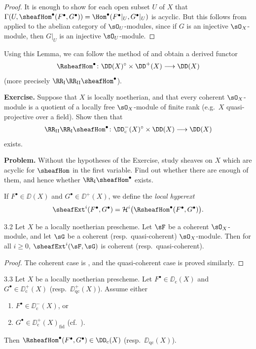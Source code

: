 \begin{proof}
It is enough to show for each open subset $U$ of $X$ that
$\Gamma(U,\sheafHom^\bullet(F^\bullet,G^\bullet)) = \Hom^\bullet(F^\bullet|_U, G^\bullet|_U)$ is acyclic. But this follows from  applied to the abelian category of $\sO_U$-modules, since if $G$ is an injective $\sO_X$-module, then $G|_U$ is an injective $\sO_U$-module.
\end{proof}

Using this Lemma, we can follow the method of  and obtain a derived functor
\[
\RsheafHom^\bullet\colon \DD(X)^\circ \times \DD^+(X) \longrightarrow \DD(X)
\]
(more precisely $\RR_{\mathrm{I}}\RR_{\mathrm{II}}\sheafHom^\bullet$).

\textbf{Exercise.}
Suppose that $X$ is locally noetherian, and that every coherent $\sO_X$-module is a quotient of a locally free $\sO_X$-module of finite rank (e.g.\ $X$ quasi-projective over a field). Show then that
\[
\RR_{\mathrm{II}}\RR_{\mathrm{I}}\sheafHom^\bullet\colon \DD_{\mathrm{c}}^-(X)^\circ \times \DD(X) \longrightarrow \DD(X)
\]
exists.

\medskip

\textbf{Problem.}
Without the hypotheses of the Exercise, study sheaves on $X$ which are acyclic for $\sheafHom$ in the first variable. Find out whether there are enough of them, and hence whether $\RR_{\mathrm{I}}\sheafHom^\bullet$ exists.

\begin{definition*}
If $F^\bullet\in\DD(X)$ and $G^\bullet\in\DD^+(X)$, we define the \emph{local hyperext}
\[
\sheafExt^i(F^\bullet,G^\bullet) = \mathcal{H}^i\big(\RsheafHom^\bullet(F^\bullet,G^\bullet)\big).
\]
\end{definition*}

\begin{booklemma}{3.2}\label{lem:2.3.2}
	Let
	$X$
	be a locally noetherian prescheme. Let $\sF$ be a coherent $\sO_X$-module, and let $\sG$ be a coherent (resp.\ quasi-coherent) $\sO_X$-module. Then for all $i\ge 0$, $\sheafExt^i(\sF,\sG)$ is coherent (resp.\ quasi-coherent).
\end{booklemma}

\begin{proof}
The coherent case is \cite[\nopp $0_{\mathrm{III}}$, 12.3.3]{EGA}, and the quasi-coherent case is proved similarly.
\end{proof}

\begin{bookproposition}{3.3}\label{prop:2.3.3}
Let $X$ be a locally noetherian prescheme. Let $F^\bullet\in\DD_{\mathrm{c}}(X)$ and $G^\bullet\in\DD_{\mathrm{c}}^+(X)$ (resp.\ $\DD_{\mathrm{qc}}^+(X)$). Assume either
\begin{enumerate}
\item[a)] $F^\bullet\in\DD_{\mathrm{c}}^-(X)$, or
\item[b)] $G^\bullet\in\DD_{\mathrm{c}}^+(X)_{\mathrm{fid}}$ (cf.\ ).
\end{enumerate}
Then $\RsheafHom^\bullet(F^\bullet,G^\bullet)\in\DD_{\mathrm{c}}(X)$ (resp.\ $\DD_{\mathrm{qc}}(X)$).
\end{bookproposition}

